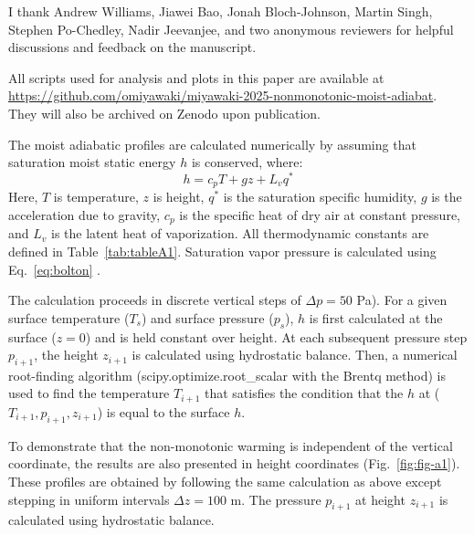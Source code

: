 \documentclass[draft]{ametsocV6.1}
\begin{document}
\acknowledgments
I thank Andrew Williams, Jiawei Bao, Jonah Bloch-Johnson, Martin Singh, Stephen Po-Chedley, Nadir Jeevanjee, and two anonymous reviewers for helpful discussions and feedback on the manuscript.

% 
%
\datastatement
All scripts used for analysis and plots in this paper are available at \url{https://github.com/omiyawaki/miyawaki-2025-nonmonotonic-moist-adiabat}. They will also be archived on Zenodo upon publication.



\appendix[A] 
\label{app:calculation}
The moist adiabatic profiles are calculated numerically by assuming that saturation moist static energy $h$ is conserved, where:
\begin{equation}
h=c_p T+gz+L_v q^* \label{eq:mse}
\end{equation}
Here, $T$ is temperature, $z$ is height, $q^*$ is the saturation specific humidity, $g$ is the acceleration due to gravity, $c_p$ is the specific heat of dry air at constant pressure, and $L_v$ is the latent heat of vaporization. All thermodynamic constants are defined in Table~\ref{tab:tableA1}. Saturation vapor pressure is calculated using Eq.~\ref{eq:bolton} \citep{bolton1980}.

The calculation proceeds in discrete vertical steps of $\Delta p = 50$ Pa). For a given surface temperature ($T_s$) and surface pressure ($p_s$), $h$ is first calculated at the surface ($z=0$) and is held constant over height. At each subsequent pressure step $p_{i+1}$, the height $z_{i+1}$ is calculated using hydrostatic balance. Then, a numerical root-finding algorithm (scipy.optimize.root\_scalar with the Brentq method) is used to find the temperature $T_{i+1}$ that satisfies the condition that the $h$ at ($T_{i+1}, p_{i+1}, z_{i+1}$) is equal to the surface $h$.

To demonstrate that the non-monotonic warming is independent of the vertical coordinate, the results are also presented in height coordinates (Fig.~\ref{fig:fig-a1}). These profiles are obtained by following the same calculation as above except stepping in uniform intervals $\Delta z=100$ m. The pressure $p_{i+1}$ at height $z_{i+1}$ is calculated using hydrostatic balance.
\end{document}
